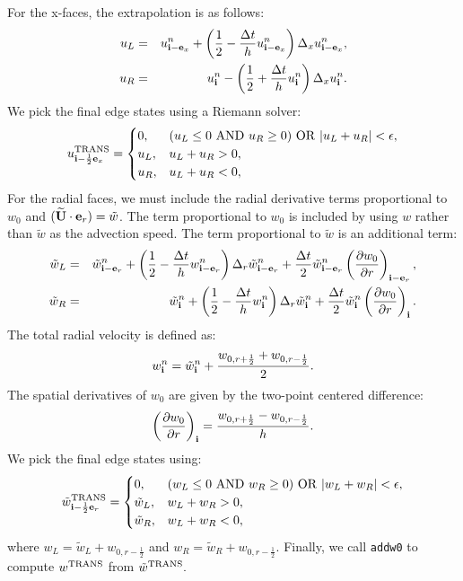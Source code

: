 \documentclass[11pt]{article}
\def\half  {\frac{1}{2}}
\def\dt    {\Delta t}
\def\trans {\rm TRANS}
\def\eb    {{\bf e}}
\def\ib    {{\bf i}}
\def\Ubt   {\widetilde{\bf U}}
\def\wt    {\tilde{w}}
\begin{document}
For the x-faces, the extrapolation is as follows:
\begin{eqnarray}
u_L &=& u_{\ib-\eb_x}^n + \left(\half - \frac{\dt}{h}u_{\ib-\eb_x}^n\right)\Delta_x u_{\ib-\eb_x}^n, \\
u_R &=& u_{\ib}^n - \left(\half + \frac{\dt}{h}u_{\ib}^n\right)\Delta_x u_{\ib}^n.
\end{eqnarray}
We pick the final edge states using a Riemann solver:
\begin{equation}
u^{\trans}_{\ib-\half\eb_x} =
\begin{cases}
0, & (u_L \le 0 ~ {\rm AND} ~ u_R \ge 0) ~ {\rm OR} ~ |u_L + u_R| < \epsilon, \\
u_L, & u_L + u_R > 0, \\
u_R, & u_L + u_R < 0, \\
\end{cases}
\end{equation}
For the radial faces, we must include the radial derivative terms proportional to $w_0$ and $(\Ubt\cdot\eb_r) = \wt$.  The term proportional to $w_0$ is included by using $w$ rather than $\wt$ as the advection speed.  The term proportional to $\wt$ is an additional term:
\begin{eqnarray}
\wt_L &=& \wt_{\ib-\eb_r}^n + \left(\half - \frac{\dt}{h}w_{\ib-\eb_r}^n\right)\Delta_r \wt_{\ib-\eb_r}^n + \frac{\dt}{2}\wt_{\ib-\eb_r}^n\left(\frac{\partial w_0}{\partial r}\right)_{\ib-\eb_r},\label{Radial utrans_L} \\
\wt_R &=& \wt_{\ib}^n + \left(\half - \frac{\dt}{h}w_{\ib}^n\right)\Delta_r \wt_{\ib}^n + \frac{\dt}{2}\wt_{\ib}^n\left(\frac{\partial w_0}{\partial r}\right)_{\ib}.\label{Radial utrans_R}
\end{eqnarray}
The total radial velocity is defined as:
\begin{equation}
w_{\ib}^n = \wt_{\ib}^n + \frac{w_{0,r+\half}+w_{0,r-\half}}{2}.\label{Total Radial Velocity}
\end{equation}
The spatial derivatives of $w_0$ are given by the two-point centered difference:
\begin{equation}
\left(\frac{\partial w_0}{\partial r}\right)_{\ib} = \frac{w_{0,r+\half}-w_{0,r-\half}}{h}.\label{Radial Derivative of w_0}
\end{equation}
We pick the final edge states using:
\begin{equation}
\wt^{\trans}_{\ib-\half\eb_r} =
\begin{cases}
0, & (w_L \le 0 ~ {\rm AND} ~ w_R \ge 0) ~ {\rm OR} ~ |w_L + w_R| < \epsilon, \\
\wt_L, & w_L + w_R > 0, \\
\wt_R, & w_L + w_R < 0, \\
\end{cases}
\end{equation}
where $w_L = \wt_L + w_{0,r-\half}$ and $w_R = \wt_R + w_{0,r-\half}$.  Finally, we call {\tt addw0} to compute $w^{\trans}$ from $\wt^{\trans}.$
\end{document}
